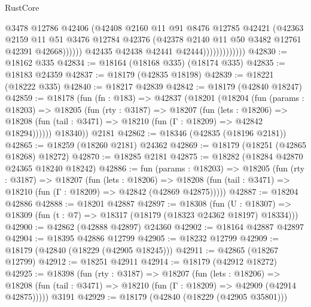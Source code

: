 \begin{lexlean}{RustCore}
\begin{coremodule}
                                    @3478
                                    @12786
                                    @42406
                                    (@42408
                                      @2160
                                      @11
                                      @91
                                      @8476
                                      @12785
                                      @42421
                                      (@42363
                                        @2159
                                        @11
                                        @51
                                        @3476
                                        @12784
                                        @42376
                                        (@42378 @2140 @11 @50 @3482 @12761 @42391 @42668))))))
                              @42435
                              @42438
                              @42441
                              @42444)))))))))))))
@42830 := @18162 @335
@42834 := @18164 (@18168 @335) (@18174 @335)
@42835 := @18183 @24359
@42837 := @18179 (@42835 @18198)
@42839 := @18221 (@18222 @335)
@42840 := @18217 @42839
@42842 := @18179 (@42840 @18247)
@42859 := @18178
    (fun (fn : @183) =>
    @42837
      (@18201
        (@18204
          (fun (params : @18203) =>
          @18205
            (fun (rty : @3187) =>
            @18207
              (fun (lets : @18206) =>
              @18208 (fun (tail : @3471) => @18210 (fun (Γ : @18209) => @42842 @18294))))))
        @18340))
    @2181
@42862 := @18346 (@42835 (@18196 @2181))
@42865 := @18259 (@18260 @2181) @24362
@42869 := @18179 (@18251 (@42865 @18268) @18272)
@42870 := @18285 @2181
@42875 := @18282 (@18284 @42870 @24365 @18240 @18242)
@42886 := fun (params : @18203) =>
  @18205
    (fun (rty : @3187) =>
    @18207
      (fun (lets : @18206) =>
      @18208 (fun (tail : @3471) => @18210 (fun (Γ : @18209) => @42842 (@42869 @42875)))))
@42887 := @18204 @42886
@42888 := @18201 @42887
@42897 := @18308
    (fun (U : @18307) => @18309 (fun (t : @7) => @18317 (@18179 (@18323 @24362 @18197) @18334)))
@42900 := @42862 (@42888 @42897) @24360
@42902 := @18164 @42887 @42897
@42904 := @18395 @42886 @12799
@42905 := @18232 @12799
@42909 := @18179 (@42840 (@18229 (@42905 @18245)))
@42911 := @42865 (@18267 @12799)
@42912 := @18251 @42911
@42914 := @18179 (@42912 @18272)
@42925 := @18398
    (fun (rty : @3187) =>
    @18207
      (fun (lets : @18206) =>
      @18208 (fun (tail : @3471) => @18210 (fun (Γ : @18209) => @42909 (@42914 @42875)))))
    @3191
@42929 := @18179 (@42840 (@18229 (@42905 @35801)))

\end{coremodule}
\end{lexlean}
